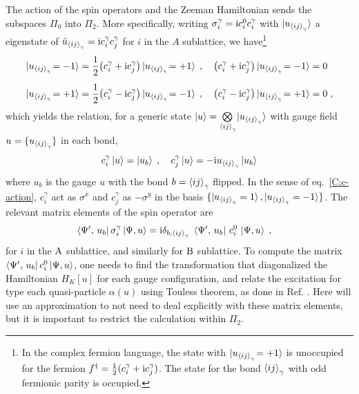 The action of the spin operators and the Zeeman Hamiltonian sends the subspaces $\Pi_0$ into $\Pi_2$.
More specifically, writing $\sigma_i^\gamma = \mathrm{i} c^0_i c^\gamma_i$ with $\ket{u_{\braket{ij}_\gamma}}$ a eigenstate of $\hat u_{\braket{ij}_\gamma} = \mathrm{i} c_i^\gamma c_j^\gamma$ for $i$ in the $A$ sublattice, we have\footnote{In the complex fermion language, the state with $\ket{u_{\braket{ij}_\gamma}\!=+1}$ is unoccupied for the fermion $f^\dagger = \frac12(c^\gamma_i + \mathrm{i}  c^\gamma_j )$.  The state for the bond $\braket{ij}_\gamma$ with odd fermionic parity is occupied. }
\begin{align}
    \ket{u_{\braket{ij}_\gamma}\!=-1}&=\frac12\big(c^\gamma_i + \mathrm{i}  c^\gamma_j \big) \ket{u_{\braket{ij}_\gamma}\!=+1} \; , \quad \big(c^\gamma_i + \mathrm{i}  c^\gamma_j \big) \ket{u_{\braket{ij}_\gamma}\!=-1} = 0 \\[5pt]
    \ket{u_{\braket{ij}_\gamma}\!=+1}&=\frac12\big(c^\gamma_i - \mathrm{i}  c^\gamma_j \big) \ket{u_{\braket{ij}_\gamma}\!=-1} \; , \quad \big(c^\gamma_i - \mathrm{i}  c^\gamma_j \big) \ket{u_{\braket{ij}_\gamma}\!=+1}=0
    \; ,
\end{align}
which yields the relation, for a generic state $\ket{u}=\bigotimes\limits_{\braket{ij}_\gamma\!}\ket{u_{\braket{ij}_\gamma}} $ with gauge field $u=\{ u_{\braket{ij}_\gamma} \}$ in each bond,
\begin{equation}
    c^\gamma_i \ket{u} =  \ket{u_b} \; , \quad
    c^\gamma_j \ket{u} = - \mathrm{i} u_{\braket{ij}_\gamma}  \ket{u_b}
    \label{C:c-action}
\end{equation}
where $u_b$ is the gauge $u$ with the bond $b=\braket{ij}_\gamma$ flipped.
In the sense of eq.~\eqref{C:c-action}, $c^\gamma_i$ act as $\sigma^x$ and $c^\gamma_j$ as $-\sigma^y$ in the basis  $\{\ket{u_{\braket{ij}_\gamma}=1},\ket{u_{\braket{ij}_\gamma}=-1}\} $.
The relevant matrix elements of the spin operator are
\begin{align}
 \bra{\Psi', \, u_b}    \sigma_i^\gamma  \ket{\Psi,u}
    &= \im \delta_{b,\braket{ij}_\gamma} \; %
    \bra{\Psi', \, u_b}
   \, c^0_i  \, \ket{\Psi,u}
    \; ,
\end{align}
for $i$ in the $\mathrm{A}$ sublattice, and similarly for $\mathrm{B}$ sublattice.
To compute the matrix $\bra{\Psi', \, u_b} c^0_i  \ket{\Psi,u}$, one needs to find the transformation that diagonalized the Hamiltonian $H_K[u]$ for each gauge configuration, and relate the excitation for type each quasi-particle $\alpha(u)$ using Touless theorem, as done in Ref. \cite{Bauer2023}. Here will use an approximation to not need to deal explicitly with these matrix elements, but it is important to restrict the calculation within $\Pi_2$.


